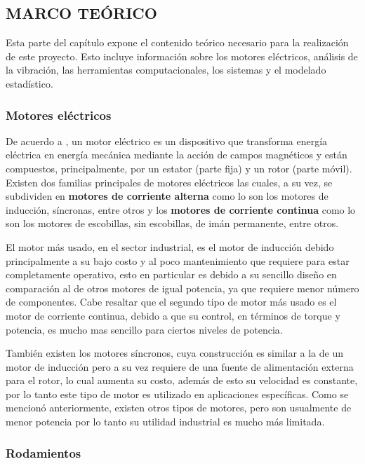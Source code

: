\subsection{MARCO TEÓRICO}

Esta parte del capítulo expone el contenido teórico necesario para la
realización de este proyecto. Esto incluye información sobre los motores
eléctricos,  análisis de la vibración, las herramientas computacionales, los
sistemas y el modelado estadístico.



\subsubsection{ Motores eléctricos}

De acuerdo a \textcite{Fraile}, un motor eléctrico es un dispositivo que
transforma energía eléctrica en
energía mecánica mediante la acción de campos magnéticos y están compuestos,
principalmente, por un estator (parte fija) y un rotor (parte móvil).
Existen dos familias principales de motores eléctricos las cuales, a su vez,
se subdividen en \textbf{motores de corriente alterna} como lo son los  motores
de inducción, síncronas, entre otros y los \textbf{motores de corriente continua}
como lo son los motores de escobillas,  sin escobillas, de imán permanente,
entre otros.

El motor más usado, en el sector industrial, es el motor de inducción debido
principalmente a su bajo costo y al poco mantenimiento que requiere para estar
completamente operativo, esto en particular es debido a su sencillo diseño
en comparación al de otros motores de igual potencia, ya que requiere  menor
número de componentes. Cabe resaltar que el segundo tipo de motor más usado es
el motor de corriente
continua, debido a que su control, en términos de torque y potencia, es mucho
mas sencillo para ciertos niveles de potencia.

También existen los motores síncronos, cuya construcción es similar a la de un
motor de inducción pero a su vez requiere de una fuente de alimentación externa
para el rotor, lo cual aumenta su costo, además de esto su velocidad es
constante, por lo tanto este tipo de motor es utilizado en aplicaciones
específicas. Como se mencionó anteriormente, existen otros tipos de motores,
pero son usualmente de menor potencia por
lo tanto su utilidad industrial es mucho más limitada.


\subsubsection*{Rodamientos}

